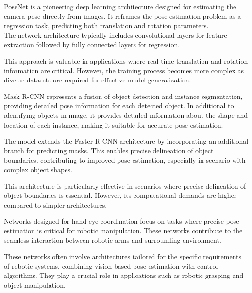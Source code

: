PoseNet \cite{PosNet} is a pioneering deep learning architecture designed for estimating the camera pose directly from images. It reframes the pose estimation problem as a regression task, predicting both translation and rotation parameters.\\
The network architecture typically includes convolutional layers for feature extraction followed by fully connected layers for regression.

This approach is valuable in applications where real-time translation and rotation information are critical. However, the training process becomes more complex as diverse datasets are required for effective model generalization.

Mask R-CNN \cite{MaskRCNN} represents a fusion of object detection and instance segmentation, providing detailed pose information for each detected object.
In additional to identifying objects in image, it provides detailed information about the shape and location of each instance, making it suitable for accurate pose estimation.

The model extends the Faster R-CNN architecture by incorporating an additional branch for predicting masks. This enables precise delineation of object boundaries, contributing to improved pose estimation, especially in scenario with complex object shapes.

This architecture is particularly effective in scenarios where precise delineation of object boundaries is essential. However, its computational demands are higher compared to simpler architectures.

Networks designed for hand-eye coordination focus on tasks where precise pose estimation is critical for robotic manipulation. These networks contribute to the seamless interaction between robotic arms and surrounding environment.

These networks often involve architectures tailored for the specific requirements of robotic systems, combining vision-based pose estimation with control algorithms. They play a crucial role in applications such as robotic grasping and object manipulation.

